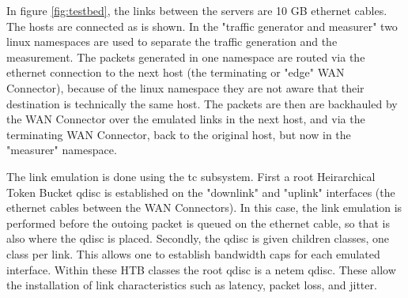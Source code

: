 In figure \ref{fig:testbed}, the links between the servers are 10 GB ethernet cables. The hosts are connected as is shown. In the "traffic generator and measurer" two linux namespaces are used to separate the traffic generation and the measurement. The packets generated in one namespace are routed via the ethernet connection to the next host (the terminating or "edge" WAN Connector), because of the linux namespace they are not aware that their destination is technically the same host. The packets are then are backhauled by the WAN Connector over the emulated links in the next host, and via the terminating WAN Connector, back to the original host, but now in the "measurer" namespace.

The link emulation is done using the tc subsystem. First a root Heirarchical Token Bucket qdisc is established on the "downlink" and "uplink" interfaces (the ethernet cables between the WAN Connectors). In this case, the link emulation is performed before the outoing packet is queued on the ethernet cable, so that is also where the qdisc is placed. Secondly, the qdisc is given children classes, one class per link. This allows one to establish bandwidth caps for each emulated interface. Within these HTB classes the root qdisc is a netem qdisc. These allow the installation of link characteristics such as latency, packet loss, and jitter.



